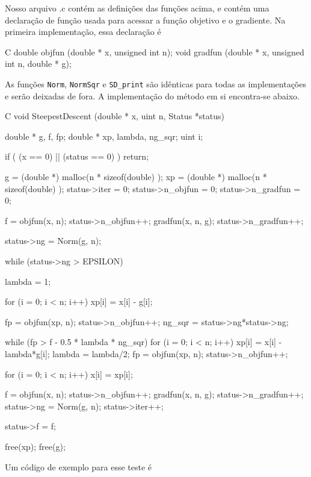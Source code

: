 \documentclass[letterpaper,11pt]{article}
\numberwithin{equation}{section}
\begin{document}
Nosso arquivo .c contém as definições das funções acima, e contém uma declaração de função
usada para acessar a função objetivo e o gradiente. Na primeira implementação, essa declaração
é
\begin{code}{C}
double objfun  (double * x, unsigned int n);
void   gradfun (double * x, unsigned int n, double * g);
\end{code}
As funções \verb+Norm+, \verb+NormSqr+ e \verb+SD_print+ são idênticas para todas as
implementações e serão deixadas de fora. A implementação do método em si encontra-se abaixo.
\scriptsize
\begin{code}{C}
void SteepestDescent (double * x, uint n, Status *status) { 
  double * g, f, fp;
  double * xp, lambda, ng_sqr;
  uint i;

  if ( (x == 0) || (status == 0) )
    return;

  g  = (double *) malloc(n * sizeof(double) );
  xp = (double *) malloc(n * sizeof(double) );
  status->iter = 0;
  status->n_objfun = 0;
  status->n_gradfun = 0;

  f = objfun(x, n);
  status->n_objfun++;
  gradfun(x, n, g);
  status->n_gradfun++;

  status->ng = Norm(g, n);

  while (status->ng > EPSILON) {
    lambda = 1;

    for (i = 0; i < n; i++) {
      xp[i] = x[i] - g[i];
    }

    fp = objfun(xp, n);
    status->n_objfun++;
    ng_sqr = status->ng*status->ng;

    while (fp > f - 0.5 * lambda * ng_sqr) {
      for (i = 0; i < n; i++) {
        xp[i] = x[i] - lambda*g[i];
      }
      lambda = lambda/2;
      fp = objfun(xp, n);
      status->n_objfun++;
    }

    for (i = 0; i < n; i++)
      x[i] = xp[i];

    f = objfun(x, n);
    status->n_objfun++;
    gradfun(x, n, g);
    status->n_gradfun++;
    status->ng = Norm(g, n);
    status->iter++;
  }

  status->f = f;

  free(xp);
  free(g);
}
\end{code}
\normalsize
Um código de exemplo para esse teste é
\scriptsize
\end{document}
